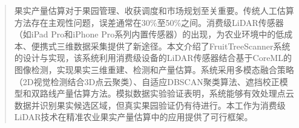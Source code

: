 \begin{abstract}
果实产量估算对于果园管理、收获调度和市场规划至关重要。传统人工估算方法存在主观性问题，误差通常在30\%至50\%之间。消费级LiDAR传感器（如iPad Pro和iPhone Pro系列内置传感器）的出现，为农业环境中的低成本、便携式三维数据采集提供了新途径。本文介绍了FruitTreeScanner系统的设计与实现，该系统利用消费级设备的LiDAR传感器结合基于CoreML的图像检测，实现果实三维重建、检测和产量估算。系统采用多模态融合策略（2D视觉检测结合3D点云聚类）、自适应DBSCAN聚类算法、遮挡校正模型和双路线产量估算方法。模拟数据实验验证表明，系统能够有效处理点云数据并识别果实候选区域，但真实果园验证仍有待进行。本工作为消费级LiDAR技术在精准农业果实产量估算中的应用提供了可行框架。
\end{abstract}
